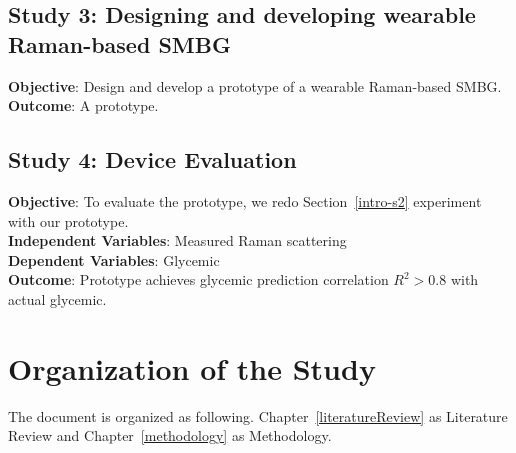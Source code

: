 \subsection{Study 3: Designing and developing wearable Raman-based SMBG}

\textbf{Objective}: Design and develop a prototype of a wearable Raman-based SMBG.\\
\textbf{Outcome}: A prototype.


\subsection{Study 4: Device Evaluation}

\textbf{Objective}: To evaluate the prototype, we redo Section~\ref{intro-s2} experiment with our prototype.\\
\textbf{Independent Variables}: Measured Raman scattering\\
\textbf{Dependent Variables}: Glycemic\\
\textbf{Outcome}: Prototype achieves glycemic prediction correlation $R^2 > 0.8$ with actual glycemic.

\section{Organization of the Study}

The document is organized as following. Chapter~\ref{literatureReview} as Literature Review and Chapter~\ref{methodology} as Methodology.